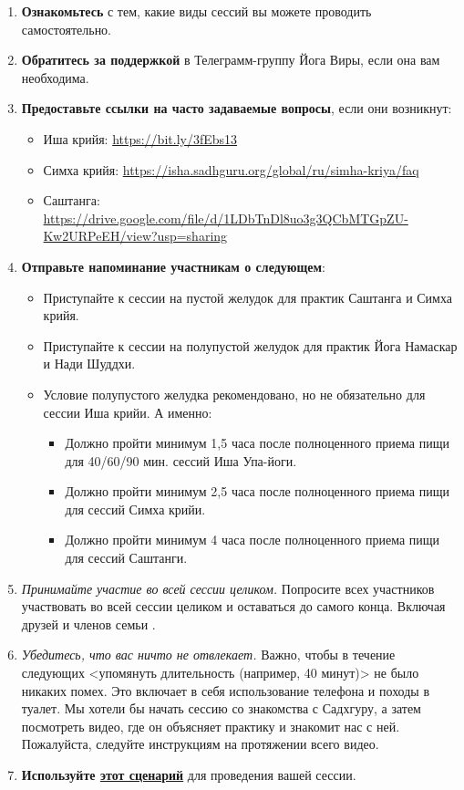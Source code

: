 \begin{enumerate}
    \item \textbf{Ознакомьтесь} с тем, какие виды сессий вы можете проводить самостоятельно.
    \item \textbf{Обратитесь за поддержкой} в Телеграмм-группу Йога Виры, если она вам
необходима.
\item \textbf{Предоставьте ссылки на часто задаваемые вопросы}, если они возникнут:
\begin{itemize}
    \item Иша крийя: \href{https://bit.ly/3fEbs13}{\tiny https://bit.ly/3fEbs13}
    \item Симха крийя: \href{https://isha.sadhguru.org/global/ru/simha-kriya/faq}{\tiny https://isha.sadhguru.org/global/ru/simha-kriya/faq}
    \item Саштанга: \href{https://drive.google.com/file/d/1LDbTnDl8uo3g3QCbMTGpZU-Kw2URPeEH/view?usp=sharing}{\tiny https://drive.google.com/file/d/1LDbTnDl8uo3g3QCbMTGpZU-Kw2URPeEH/view?usp=sharing}
\end{itemize}
\item \textbf{Отправьте напоминание участникам о следующем}:
    \begin{itemize}
    \item Приступайте к сессии на пустой желудок для практик Саштанга и Симха крийя.
    \item Приступайте к сессии на полупустой желудок для практик Йога Намаскар и Нади Шуддхи.
    \item Условие полупустого желудка рекомендовано, но не обязательно для сессии Иша крийи.
    А именно:
    \begin{itemize}
        \item[\faClockO] Должно пройти минимум 1,5 часа после полноценного приема пищи для 40/60/90 мин. сессий Иша Упа-йоги.
        \item[\faClockO] Должно пройти минимум 2,5 часа после полноценного приема пищи для сессий Симха крийи.
        \item[\faClockO] Должно пройти минимум 4 часа после полноценного приема пищи для сессий Саштанги.
    \end{itemize}
    \end{itemize}

\item \emph{Принимайте участие во всей сессии целиком.} Попросите всех участников участвовать во всей сессии целиком и оставаться до самого конца. Включая друзей и членов семьи \faSmileO.
\item \emph{Убедитесь, что вас ничто не отвлекает.} Важно, чтобы в течение следующих <упомянуть длительность (например, 40 минут)> не было никаких
помех. Это включает в себя использование телефона и походы в туалет. Мы
хотели бы начать сессию со знакомства с Садхгуру, а затем посмотреть
видео, где он объясняет практику и знакомит нас с ней. Пожалуйста,
следуйте инструкциям на протяжении всего видео.
\item \textbf{Используйте \hyperref[sec:plan]{этот сценарий}} для проведения вашей сессии.
\end{enumerate}

